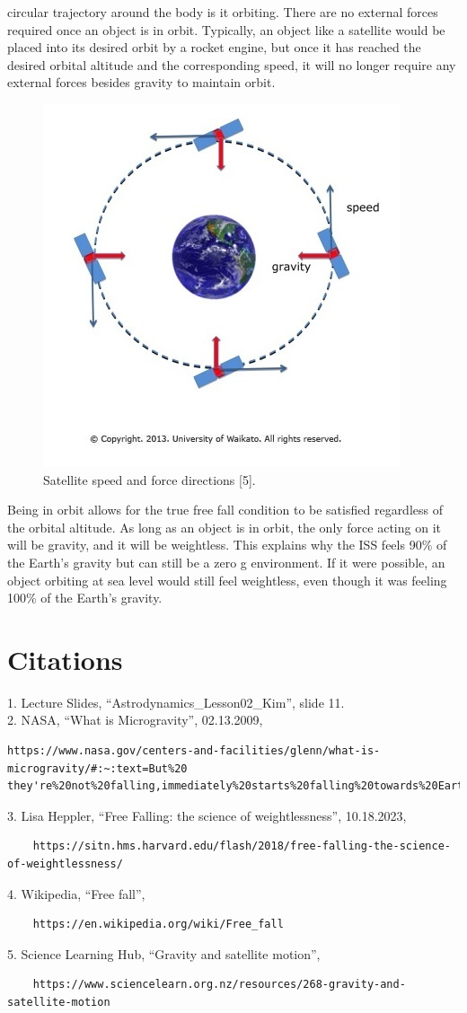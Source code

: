 \documentclass[12 pt]{article}
\begin{document}
circular trajectory around the body is it orbiting. There are no external forces required once an object is in orbit.
Typically, an object like a satellite would be placed into its desired orbit by a rocket engine, but once it has reached
the desired orbital altitude and the corresponding speed, it will no longer require any external forces besides gravity
to maintain orbit.
\begin{figure}[H]
    \centering
    \includegraphics[width=0.5\linewidth]{figs/sat.jpg}
    \caption{Satellite speed and force directions [5].}
    \label{fig:sat}
\end{figure}
Being in orbit allows for the true free fall condition to be satisfied regardless of the orbital altitude. As long as an
object is in orbit, the only force acting on it will be gravity, and it will be weightless. This explains why the ISS
feels 90\% of the Earth's gravity but can still be a zero g environment. If it were possible, an object orbiting at sea
level would still feel weightless, even though it was feeling 100\% of the Earth's gravity.

\pagebreak
\section*{Citations}
1. Lecture Slides, ``Astrodynamics\_Lesson02\_Kim'', slide 11. \\
2. NASA, ``What is Microgravity'', 02.13.2009,
\begin{verbatim}
https://www.nasa.gov/centers-and-facilities/glenn/what-is-microgravity/#:~:text=But%20
they're%20not%20falling,immediately%20starts%20falling%20towards%20Earth.
\end{verbatim}
3. Lisa Heppler, ``Free Falling: the science of weightlessness'', 10.18.2023,
\begin{verbatim}
    https://sitn.hms.harvard.edu/flash/2018/free-falling-the-science-of-weightlessness/
\end{verbatim}
4. Wikipedia, ``Free fall'',
\begin{verbatim}
    https://en.wikipedia.org/wiki/Free_fall
\end{verbatim}
5. Science Learning Hub, ``Gravity and satellite motion'',
\begin{verbatim}
    https://www.sciencelearn.org.nz/resources/268-gravity-and-satellite-motion
\end{verbatim}
\end{document}
